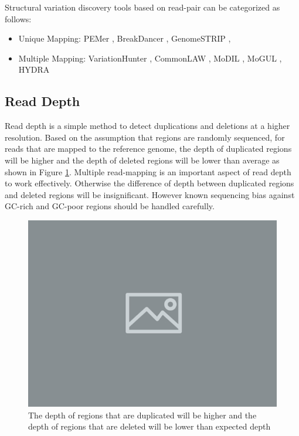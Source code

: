 Structural variation discovery tools based on read-pair can be categorized as follows:
\begin{itemize}
    \item Unique Mapping: PEMer \cite{korbel2009pemer}, BreakDancer \cite{chen2009breakdancer}, GenomeSTRIP \cite{handsaker2015large}, 
    \item Multiple Mapping: VariationHunter \cite{hormozdiari2009combinatorial}, CommonLAW \cite{hormozdiari2011simultaneous}, MoDIL \cite{lee2009modil}, MoGUL \cite{lee2010mogul}, HYDRA \cite{quinlan2010genome}
\end{itemize}
\subsection{Read Depth}
Read depth is a simple method to detect duplications and deletions at a higher resolution. Based on the assumption that regions are randomly sequenced, for reads that are mapped to the reference genome, the depth of duplicated regions will be higher and the depth of deleted regions will be lower than average \cite{bailey2002recent} as shown in Figure \ref{readdepth}. Multiple read-mapping is an important aspect of read depth to work effectively. Otherwise the difference of depth between duplicated regions and deleted regions will be insignificant. However known sequencing bias against GC-rich and GC-poor regions \cite{smith2008rapid} should be handled carefully.

\begin{figure}[ht]
    \centering
    \includegraphics[scale=0.4]{images/placeholder.jpg}
    \caption{The depth of regions that are duplicated will be higher and the depth of regions that are deleted will be lower than expected depth}
    \label{readdepth}
\end{figure}

